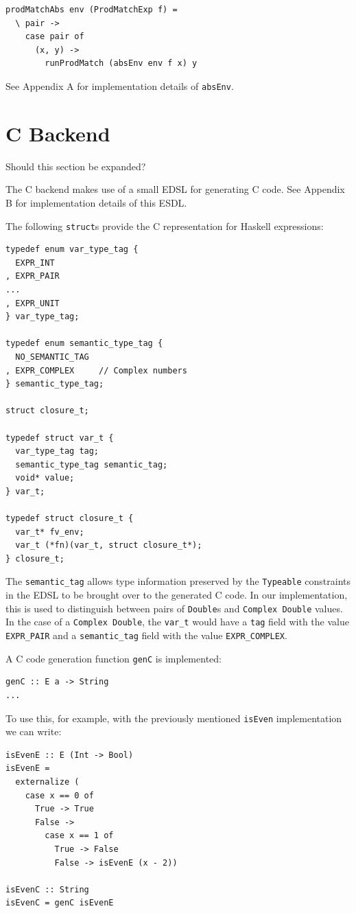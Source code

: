\documentclass[runningheads, a4paper]{llncs}
\newcommand{\ttt}{\texttt}
\newenvironment{todont}
               {\comment}
               {\endcomment}
\begin{document}
\begin{lstlisting}
prodMatchAbs env (ProdMatchExp f) =
  \ pair ->
    case pair of
      (x, y) ->
        runProdMatch (absEnv env f x) y
\end{lstlisting}

See Appendix A for implementation details of \ttt{absEnv}.


\section{C Backend}
\label{sec:CBackend}

\begin{todont}
  Should this section be expanded?
\end{todont}

The C backend makes use of a small EDSL for generating C code. See
Appendix B for implementation details of this ESDL.

The following \ttt{struct}s provide the C representation for Haskell expressions:

\begin{lstlisting}
typedef enum var_type_tag {
  EXPR_INT
, EXPR_PAIR
...
, EXPR_UNIT
} var_type_tag;

typedef enum semantic_type_tag {
  NO_SEMANTIC_TAG
, EXPR_COMPLEX     // Complex numbers
} semantic_type_tag;

struct closure_t;

typedef struct var_t {
  var_type_tag tag;
  semantic_type_tag semantic_tag;
  void* value;
} var_t;

typedef struct closure_t {
  var_t* fv_env;
  var_t (*fn)(var_t, struct closure_t*);
} closure_t;
\end{lstlisting}

The \ttt{semantic\_tag} allows type information preserved by the \ttt{Typeable} constraints
in the EDSL to be brought over to the generated C code. In our implementation, this is
used to distinguish between pairs of \ttt{Double}s and \ttt{Complex Double} values. In the
case of a \ttt{Complex Double}, the \ttt{var\_t} would have a \ttt{tag} field with the value
\ttt{EXPR\_PAIR} and a \ttt{semantic\_tag} field with the value \ttt{EXPR\_COMPLEX}.

A C code generation function \ttt{genC} is implemented:

\begin{lstlisting}
genC :: E a -> String
...
\end{lstlisting}

To use this, for example, with the previously mentioned \ttt{isEven} implementation we
can write:
\begin{lstlisting}
isEvenE :: E (Int -> Bool)
isEvenE =
  externalize (
    case x == 0 of
      True -> True
      False ->
        case x == 1 of
          True -> False
          False -> isEvenE (x - 2))

isEvenC :: String
isEvenC = genC isEvenE
\end{lstlisting}
\end{document}
